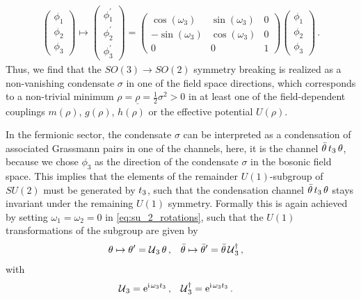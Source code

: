\begin{align*}
	\begin{pmatrix}
		\phi_1	\\
		\phi_2	\\
		\phi_3
	\end{pmatrix} \mapsto
	\begin{pmatrix}
		\phi^\prime_1	\\
		\phi^\prime_2	\\
		\phi^\prime_3
	\end{pmatrix}
	=
	\begin{pmatrix}
		\cos(\omega_3)	&	\sin(\omega_3)	&	0	\\
		-\sin(\omega_3)	&	\cos(\omega_3)		&	0	\\
		0				&	0					&	1
	\end{pmatrix}
	\begin{pmatrix}
		\phi_1	\\
		\phi_2	\\
		\phi_3
	\end{pmatrix} \,.
\end{align*}
Thus, we find that the $SO(3) \rightarrow SO(2)$ symmetry breaking is realized as a non-vanishing condensate $\sigma$ in one of the field space directions, which corresponds to a non-trivial minimum $\rho=\underline{\rho}=\tfrac{1}{2}\sigma^2>0$ in at least one of the field-dependent couplings $m(\rho)$, $g(\rho)$, $h(\rho)$ or the effective potential $U(\rho)$.

In the fermionic sector, the condensate $\sigma$ can be interpreted as a condensation of associated Grassmann pairs in one of the channels, here, \wlogA{} it is the channel $\bar{\theta} \, t_{3} \, \theta$, because we chose $\phi_3$ as the direction of the condensate $\sigma$ in the bosonic field space. This implies that the elements of the remainder $U(1)$-subgroup of $SU(2)$ must be generated by $ t_{3}$, such that the condensation channel $\bar{\theta} \,  t_{3} \, \theta$ stays invariant under the remaining $U(1)$ symmetry.
Formally this is again achieved by setting $\omega_{1}=\omega_2 = 0$ in \cref{eq:su_2_rotations}, such that the $U(1)$ transformations of the subgroup are given by
\begin{align}
	&	\theta \mapsto \theta^\prime = 	\mathcal{U}{}_3\, \theta \, , &&\bar{\theta} \mapsto \bar{\theta}^\prime = \bar{\theta}\, 	\mathcal{U}{}_3^\dagger \, ,
\end{align}
with 
\begin{align}
	&	\suNU{}_3 = \eu^{\iu\vts{}\omega_3 \suIIt{3} } \, , &&\suNU{}_3^\dagger = \eu^{\iu\vts{} \omega_3 \suIIt{3} } \, .	\label{eq:u_1_from_su_2}
\end{align}

